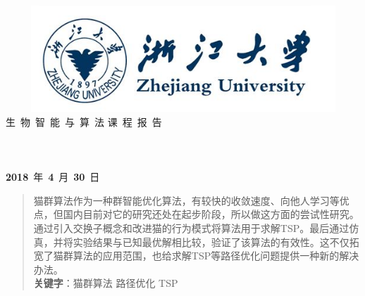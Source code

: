 \documentclass[UTF8]{ctexart}
\begin{document}
\begin{titlepage}
\centering
\vspace*{1.75cm}
\quad\includegraphics[width=15cm,height=4cm]{zju.png}\\
\vspace*{1cm}
{\fontsize{40pt}\baselineskip 生\ 物\ 智\ 能\ 与\ 算\ 法\vskip 0.5cm 课\ 程\ 报\ 告}
 \vskip 5cm
 \fontsize{19pt}\baselineskip
 \underline{}\\%
 \vskip 1.0cm
 \underline{}\\
 \vskip 1.0cm
 \underline{}\\
 \vskip 1.0cm
 \underline{}\\
 \vskip 1.2cm
 \LARGE \textbf{2018}~年~\textbf{4}~月~\textbf{30}~日		 
\end{titlepage}

 \begin{abstract}
 	\pagestyle{plain}
 	\thispagestyle{empty}
\par 猫群算法作为一种群智能优化算法，有较快的收敛速度、向他人学习等优点，但国内目前对它的研究还处在起步阶段，所以做这方面的尝试性研究。通过引入交换子概念和改进猫的行为模式将算法用于求解TSP。最后通过仿真，并将实验结果与已知最优解相比较，验证了该算法的有效性。这不仅拓宽了猫群算法的应用范围，也给求解TSP等路径优化问题提供一种新的解决办法。
\\[0.5cm]
\textbf{关键字}：\quad 猫群算法 \quad 路径优化 \quad TSP
\newpage
\end{abstract}

\tableofcontents%
\end{document}
